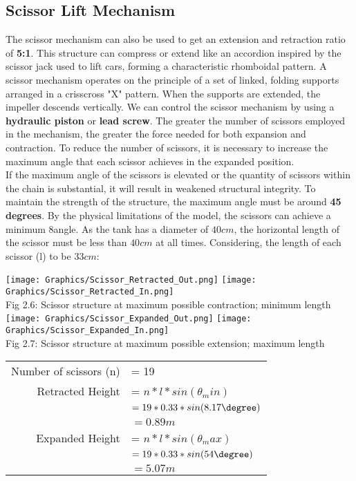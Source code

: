 \documentclass[a4,10pt]{report}
\begin{document}
\subsection{Scissor Lift Mechanism}
The scissor mechanism can also be used to get an extension and retraction ratio of \textbf{5:1}. This structure can compress or extend like an accordion inspired by the scissor jack used to lift cars, forming a characteristic rhomboidal pattern. A scissor mechanism operates on the principle of a set of linked, folding supports arranged in a crisscross "X" pattern. When the supports are extended, the impeller descends vertically.\cite{scissor_jack_1} We can control the scissor mechanism by using a \textbf{hydraulic piston} or \textbf{lead screw}. The greater the number of scissors employed in the mechanism, the greater the force needed for both expansion and contraction. To reduce the number of scissors, it is necessary to increase the maximum angle that each scissor achieves in the expanded position. 
\vspace{2mm} \\
If the maximum angle of the scissors is elevated or the quantity of scissors within the chain is substantial, it will result in weakened structural integrity. To maintain the strength of the structure, the maximum angle must be around \textbf{45 degrees}. By the physical limitations of the model, the scissors can achieve a minimum 8\degree angle. As the tank has a diameter of $40 cm$, the horizontal length of the scissor must be less than $40 cm$ at all times.\cite{scissor_jack_2} Considering, the length of each scissor (l) to be $33 cm$:\\ 

\begin{center}
    \texttt{[image: Graphics/Scissor\_Retracted\_Out.png]}
    \texttt{[image: Graphics/Scissor\_Retracted\_In.png]} \\
    \normalsize{Fig 2.6: Scissor structure at maximum possible contraction; minimum length} \\
    \vspace{0.4cm}
    \texttt{[image: Graphics/Scissor\_Expanded\_Out.png]}
    \texttt{[image: Graphics/Scissor\_Expanded\_In.png]} \\
    \normalsize{Fig 2.7: Scissor structure at maximum possible extension; maximum length } \\
    \vspace{0.8cm}
    \begin{tabular}{r l}
    Number of scissors (n) &= 19 \\
    Retracted Height &= $n*l*sin(\theta_min)$ \\
    &$= 19*0.33*sin(8.17\degree)$ \\
    &$= 0.89 m$ \\
    Expanded Height &= $n*l*sin(\theta_max)$ \\
    &$= 19*0.33*sin(54\degree)$ \\
    &$= 5.07 m$
    \end{tabular}
\end{center}
\end{document}
